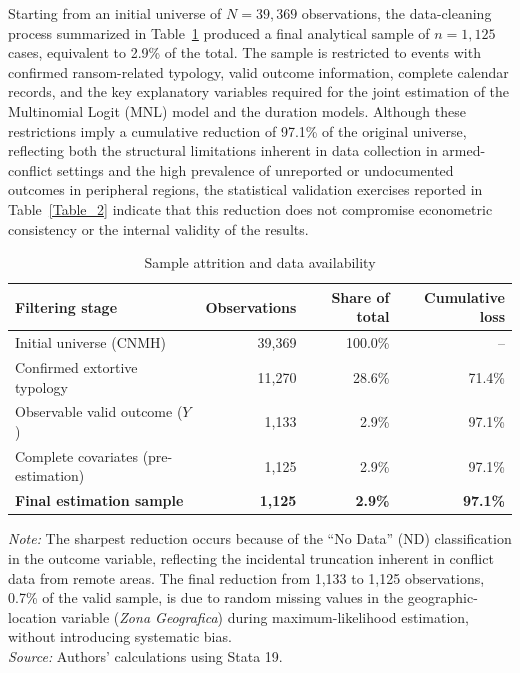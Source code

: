 \documentclass[12pt,a4paper]{article}
\theoremstyle{plain}
\theoremstyle{definition}
\theoremstyle{remark}
\newcommand{\1}{\mathbf{1}}
\begin{document}
Starting from an initial universe of \(N=39{,}369\) observations, the data-cleaning process summarized in Table~\ref{Table_1} produced a final analytical sample of \(n=1{,}125\) cases, equivalent to 2.9\% of the total. The sample is restricted to events with confirmed ransom-related typology, valid outcome information, complete calendar records, and the key explanatory variables required for the joint estimation of the Multinomial Logit (MNL) model and the duration models. Although these restrictions imply a cumulative reduction of 97.1\% of the original universe, reflecting both the structural limitations inherent in data collection in armed-conflict settings and the high prevalence of unreported or undocumented outcomes in peripheral regions, the statistical validation exercises reported in Table~\ref{Table_2} indicate that this reduction does not compromise econometric consistency or the internal validity of the results.

\begin{table}[htbp]
\centering
\caption{Sample attrition and data availability}
\label{Table_1}
\begin{tabularx}{\textwidth}{@{} X r r r @{}}
\toprule
\textbf{Filtering stage} & \textbf{Observations} & \textbf{Share of total} & \textbf{Cumulative loss} \\
\midrule
Initial universe (CNMH) & 39,369 & 100.0\% & -- \\
Confirmed extortive typology & 11,270 & 28.6\% & 71.4\% \\
Observable valid outcome ($Y$) & 1,133 & 2.9\% & 97.1\% \\
Complete covariates (pre-estimation) & 1,125 & 2.9\% & 97.1\% \\
\textbf{Final estimation sample} & \textbf{1,125} & \textbf{2.9\%} & \textbf{97.1\%} \\
\bottomrule
\end{tabularx}
\vspace{0.2cm}
\begin{minipage}{0.96\textwidth}
\footnotesize
\textit{Note:} The sharpest reduction occurs because of the ``No Data'' (ND) classification in the outcome variable, reflecting the incidental truncation inherent in conflict data from remote areas. The final reduction from 1,133 to 1,125 observations, 0.7\% of the valid sample, is due to random missing values in the geographic-location variable (\textit{Zona Geografica}) during maximum-likelihood estimation, without introducing systematic bias.\\
\textit{Source:} Authors' calculations using Stata 19.
\end{minipage}
\end{table}
\end{document}
